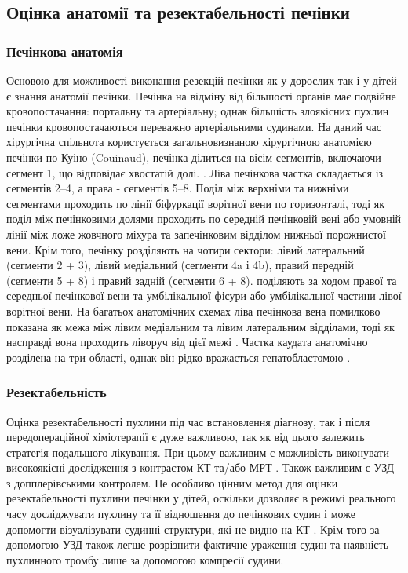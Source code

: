 \subsection{Оцінка анатомії та резектабельності печінки}
\subsubsection{Печінкова анатомія}
Основою для можливості виконання резекцій печінки як у дорослих так і у дітей є знання анатомії печінки. Печінка на відміну від більшості органів має подвійне кровопостачання: портальну та артеріальну; однак більшість злоякісних пухлин печінки кровопостачаються переважно артеріальними судинами. На даний час хірургічна спільнота користується загальновизнаною хірургічною анатомією печінки по Куіно (Couinaud), печінка ділиться на вісім сегментів, включаючи сегмент 1, що відповідає хвостатій долі. \cite{pmid28347528}. Ліва печінкова частка складається із сегментів 2–4, а права - сегментів 5–8. Поділ між верхніми та нижніми сегментами проходить по лінії біфуркації ворітної вени по горизонталі, тоді як поділ між печінковими долями проходить по середній печінковій вені або умовній лінії між ложе жовчного міхура та запечінковим відділом нижньої порожнистої вени. Крім того, печінку розділяють на чотири сектори: лівий латеральний (сегменти 2 + 3), лівий медіальний (сегменти 4a і 4b), правий передній (сегменти 5 + 8) і правий задній (сегменти 6 + 8).  поділяють за ходом правої та середньої печінкової вени та умбілікальної фісури або умбілікальної частини лівої ворітної вени. На багатьох анатомічних схемах ліва печінкова вена помилково показана як межа між лівим медіальним та лівим латеральним відділами, тоді як насправді вона проходить ліворуч від цієї межі \cite{pmid2852560}. Частка каудата анатомічно розділена на три області, однак він рідко вражається гепатобластомою \cite{pmid28620649}. 

\subsubsection{Резектабельність}
Оцінка резектабельності пухлини під час встановлення діагнозу, так і після передопераційної хіміотерапії є дуже важливою, так як від цього залежить стратегія подальшого лікування. При цьому важливим є можливість виконувати високоякісні дослідження з контрастом КТ та/або МРТ \cite{pmid28651228}. Також важливим є УЗД з допплерівськими контролем. Це особливо цінним метод для оцінки резектабельності пухлини печінки у дітей, оскільки дозволяє в режимі реального часу досліджувати пухлину та її відношення до печінкових судин і може допомогти візуалізувати судинні структури, які не видно на КТ \cite{pmid28921839}. Крім того за допомогою УЗД також легше розрізнити фактичне ураження судин та наявність пухлинного тромбу лише за допомогою компресії судини. 

